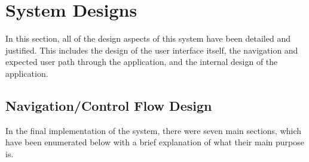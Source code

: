 \section{System Designs}
In this section, all of the design aspects of this system have been detailed and justified. This includes the design of the user interface itself, the navigation and expected user path through the application, and the internal design of the application.

\subsection{Navigation/Control Flow Design}
In the final implementation of the system, there were seven main sections, which have been enumerated below with a brief explanation of what their main purpose is.

